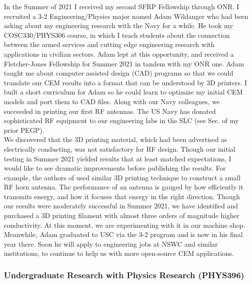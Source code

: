 \documentclass[../../../main.tex]{subfiles}
\begin{document}
In the Summer of 2021 I received my second SFRP Fellowship through ONR.  I recruited a 3-2 Engineering/Physics major named Adam Wildanger who had been asking about my engineering research with the Navy for a while.  He took my COSC330/PHYS306 course, in which I teach students about the connection between the armed services and cutting edge engineering research with applications in civilian sectors.  Adam lept at this opportunity, and received a Fletcher-Jones Fellowship for Summer 2021 in tandem with my ONR one.  Adam taught me about computer assisted design (CAD) programs so that we could translate our CEM results into a format that can be understood by 3D printers.  I built a short curriculum for Adam so he could learn to optimize my initial CEM models and port them to CAD files.  Along with our Navy colleagues, we succeeded in printing our first RF antennas.  The US Navy has donated sophisticated RF equipment to our engineering labs in the SLC (see Sec. of my prior PEGP).
\\
\vspace{0.15cm}
We discovered that the 3D printing material, which had been advertised as electrically conducting, was not satisfactory for RF design.  Though our initial testing in Summer 2021 yielded results that at least matched expectations, I would like to see dramatic improvements before publishing the results.  For example, the authors of \cite{10.1109/access.2019.2932912} used similar 3D printing technique to construct a small RF horn antenna.  The performance of an antenna is gauged by how efficiently it transmits energy, and how it focuses that energy in the right direction.  Though our results were moderately successful in Summer 2021, we have identified and purchased a 3D printing filament with almost three orders of magnitude higher conductivity.  At this moment, we are experimenting with it in our machine shop.  Meanwhile, Adam graduated to USC via the 3-2 program and is now in his final year there.  Soon he will apply to engineering jobs at NSWC and similar institutions, to continue to help us with more open-source CEM applications.

\subsubsection{Undergraduate Research with Physics Research (PHYS396)}
\end{document}
